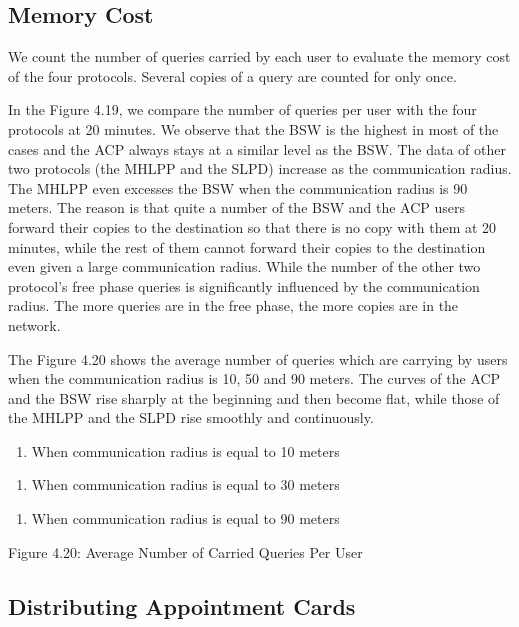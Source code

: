 \subsection{ Memory Cost}

\noindent We count the number of queries carried by each user to evaluate the memory cost of the four protocols. Several copies of a query are counted for only once.

In the Figure 4.19, we compare the number of queries per user with the four protocols at 20 minutes. We observe that the BSW is the highest in most of the cases and the ACP always stays at a similar level as the BSW. The data of other two protocols (the MHLPP and the SLPD) increase as the communication radius. The MHLPP even excesses the BSW when the communication radius is 90 meters. The reason is that quite a number of the BSW and the ACP users forward their copies to the destination so that there is no copy with them at 20 minutes, while the rest of them cannot forward their copies to the destination even given a large communication radius. While the number of the other two protocol's free phase queries is significantly influenced by the communication radius. The more queries are in the free phase, the more copies are in the network.

The Figure 4.20 shows the average number of queries which are carrying by users when the communication radius is 10, 50 and 90 meters. The curves of the ACP and the BSW rise sharply at the beginning and then become flat, while those of the MHLPP and the SLPD rise smoothly and continuously. 

\begin{enumerate}
\item  When communication radius is equal to 10 meters
\end{enumerate}

\begin{enumerate}
\item  When communication radius is equal to 30 meters
\end{enumerate}

\begin{enumerate}
\item  When communication radius is equal to 90 meters
\end{enumerate}

Figure 4.20: Average Number of Carried Queries Per User

\subsection{ Distributing Appointment Cards}

